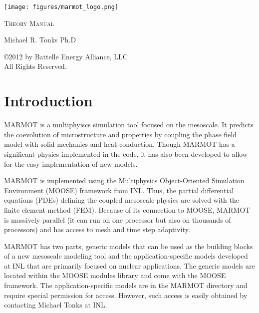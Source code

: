 \documentclass[letter,12pt,fleqn]{article}
\begin{document}
\begin{titlepage}

\begin{center}

 \texttt{[image: figures/marmot\_logo.png]}
 
 \vspace{20pt}

\textsc{\huge Theory Manual}

 \vspace{20pt}


Michael R. Tonks Ph.D

\date{}

\end{center}

\vfill	
\begin{center}
\copyright 2012 by Battelle Energy Alliance, LLC\\
All Rights Reserved.
\end{center}

\thispagestyle{empty}

\end{titlepage}


\tableofcontents

\newpage

\section{Introduction}

MARMOT is a multiphyiscs simulation tool focused on the mesoscale. It predicts the coevolution of microstructure and properties by coupling the phase field model with solid mechanics and heat conduction. Though MARMOT has a significant physics implemented in the code, it has also been developed to allow for the easy implementation of new models.

MARMOT is implemented using the Multiphysics Object-Oriented Simulation Environment (MOOSE) framework from INL. Thus, the partial differential equations (PDEs) defining the coupled mesoscale physics are solved with the finite element method (FEM). Because of its connection to MOOSE, MARMOT is massively parallel (it can run on one processor but also on thousands of processors) and has access to mesh and time step adaptivity.

MARMOT has two parts, generic models that can be used as the building blocks of a new mesoscale modeling tool and the application-specific models developed at INL that are primarily focused on nuclear applications. The generic models are located within the MOOSE modules library and come with the MOOSE framework. The application-specific models are in the MARMOT directory and require special permission for access. However, such access is easily obtained by contacting Michael Tonks at INL.
\end{document}
